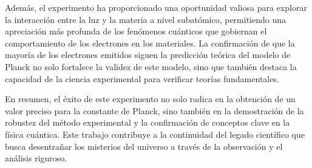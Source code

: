\documentclass[twocolumn,a4paper,11pt]{scrartcl}
\begin{document}
Además, el experimento ha proporcionado una oportunidad valiosa para explorar la interacción entre la luz y la materia a nivel subatómico, permitiendo una apreciación más profunda de los fenómenos cuánticos que gobiernan el comportamiento de los electrones en los materiales. La confirmación de que la mayoría de los electrones emitidos siguen la predicción teórica del modelo de Planck no solo fortalece la validez de este modelo, sino que también destaca la capacidad de la ciencia experimental para verificar teorías fundamentales.

En resumen, el éxito de este experimento no solo radica en la obtención de un valor preciso para la constante de Planck, sino también en la demostración de la robustez del método experimental y la confirmación de conceptos clave en la física cuántica. Este trabajo contribuye a la continuidad del legado científico que busca desentrañar los misterios del universo a través de la observación y el análisis riguroso.


\end{document}
